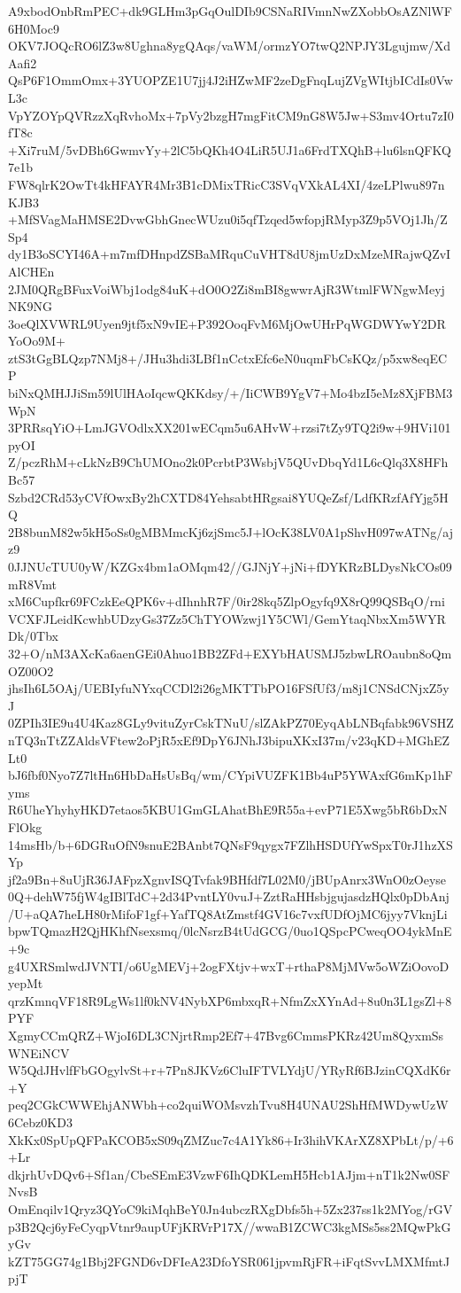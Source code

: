 A9xbodOnbRmPEC+dk9GLHm3pGqOulDIb9CSNaRIVmnNwZXobbOsAZNlWF6H0Moc9
OKV7JOQcRO6lZ3w8Ughna8ygQAqs/vaWM/ormzYO7twQ2NPJY3Lgujmw/XdAafi2
QsP6F1OmmOmx+3YUOPZE1U7jj4J2iHZwMF2zeDgFnqLujZVgWItjbICdIs0VwL3c
VpYZOYpQVRzzXqRvhoMx+7pVy2bzgH7mgFitCM9nG8W5Jw+S3mv4Ortu7zI0fT8c
+Xi7ruM/5vDBh6GwmvYy+2lC5bQKh4O4LiR5UJ1a6FrdTXQhB+lu6lsnQFKQ7e1b
FW8qlrK2OwTt4kHFAYR4Mr3B1cDMixTRicC3SVqVXkAL4XI/4zeLPlwu897nKJB3
+MfSVagMaHMSE2DvwGbhGnecWUzu0i5qfTzqed5wfopjRMyp3Z9p5VOj1Jh/ZSp4
dy1B3oSCYI46A+m7mfDHnpdZSBaMRquCuVHT8dU8jmUzDxMzeMRajwQZvIAlCHEn
2JM0QRgBFuxVoiWbj1odg84uK+dO0O2Zi8mBI8gwwrAjR3WtmlFWNgwMeyjNK9NG
3oeQlXVWRL9Uyen9jtf5xN9vIE+P392OoqFvM6MjOwUHrPqWGDWYwY2DRYoOo9M+
ztS3tGgBLQzp7NMj8+/JHu3hdi3LBf1nCctxEfc6eN0uqmFbCsKQz/p5xw8eqECP
biNxQMHJJiSm59lUlHAoIqcwQKKdsy/+/IiCWB9YgV7+Mo4bzI5eMz8XjFBM3WpN
3PRRsqYiO+LmJGVOdlxXX201wECqm5u6AHvW+rzsi7tZy9TQ2i9w+9HVi101pyOI
Z/pczRhM+cLkNzB9ChUMOno2k0PcrbtP3WsbjV5QUvDbqYd1L6cQlq3X8HFhBc57
Szbd2CRd53yCVfOwxBy2hCXTD84YehsabtHRgsai8YUQeZsf/LdfKRzfAfYjg5HQ
2B8bunM82w5kH5oSs0gMBMmcKj6zjSmc5J+lOcK38LV0A1pShvH097wATNg/ajz9
0JJNUcTUU0yW/KZGx4bm1aOMqm42//GJNjY+jNi+fDYKRzBLDysNkCOs09mR8Vmt
xM6Cupfkr69FCzkEeQPK6v+dIhnhR7F/0ir28kq5ZlpOgyfq9X8rQ99QSBqO/rni
VCXFJLeidKcwhbUDzyGs37Zz5ChTYOWzwj1Y5CWl/GemYtaqNbxXm5WYRDk/0Tbx
32+O/nM3AXcKa6aenGEi0Ahuo1BB2ZFd+EXYbHAUSMJ5zbwLROaubn8oQmOZ00O2
jhsIh6L5OAj/UEBIyfuNYxqCCDl2i26gMKTTbPO16FSfUf3/m8j1CNSdCNjxZ5yJ
0ZPIh3IE9u4U4Kaz8GLy9vituZyrCskTNuU/slZAkPZ70EyqAbLNBqfabk96VSHZ
nTQ3nTtZZAldsVFtew2oPjR5xEf9DpY6JNhJ3bipuXKxI37m/v23qKD+MGhEZLt0
bJ6fbf0Nyo7Z7ltHn6HbDaHsUsBq/wm/CYpiVUZFK1Bb4uP5YWAxfG6mKp1hFyms
R6UheYhyhyHKD7etaos5KBU1GmGLAhatBhE9R55a+evP71E5Xwg5bR6bDxNFlOkg
14msHb/b+6DGRuOfN9snuE2BAnbt7QNsF9qygx7FZlhHSDUfYwSpxT0rJ1hzXSYp
jf2a9Bn+8uUjR36JAFpzXgnvISQTvfak9BHfdf7L02M0/jBUpAnrx3WnO0zOeyse
0Q+dehW75fjW4gIBlTdC+2d34PvntLY0vuJ+ZztRaHHsbjgujasdzHQlx0pDbAnj
/U+aQA7heLH80rMifoF1gf+YafTQ8AtZmstf4GV16c7vxfUDfOjMC6jyy7VknjLi
bpwTQmazH2QjHKhfNsexsmq/0lcNsrzB4tUdGCG/0uo1QSpcPCweqOO4ykMnE+9c
g4UXRSmlwdJVNTI/o6UgMEVj+2ogFXtjv+wxT+rthaP8MjMVw5oWZiOovoDyepMt
qrzKmnqVF18R9LgWs1lf0kNV4NybXP6mbxqR+NfmZxXYnAd+8u0n3L1gsZl+8PYF
XgmyCCmQRZ+WjoI6DL3CNjrtRmp2Ef7+47Bvg6CmmsPKRz42Um8QyxmSsWNEiNCV
W5QdJHvlfFbGOgylvSt+r+7Pn8JKVz6CluIFTVLYdjU/YRyRf6BJzinCQXdK6r+Y
peq2CGkCWWEhjANWbh+co2quiWOMsvzhTvu8H4UNAU2ShHfMWDywUzW6Cebz0KD3
XkKx0SpUpQFPaKCOB5xS09qZMZuc7c4A1Yk86+Ir3hihVKArXZ8XPbLt/p/+6+Lr
dkjrhUvDQv6+Sf1an/CbeSEmE3VzwF6IhQDKLemH5Hcb1AJjm+nT1k2Nw0SFNvsB
OmEnqilv1Qryz3QYoC9kiMqhBeY0Jn4ubczRXgDbfs5h+5Zx237ss1k2MYog/rGV
p3B2Qcj6yFeCyqpVtnr9aupUFjKRVrP17X//wwaB1ZCWC3kgMSs5ss2MQwPkGyGv
kZT75GG74g1Bbj2FGND6vDFIeA23DfoYSR061jpvmRjFR+iFqtSvvLMXMfmtJpjT

